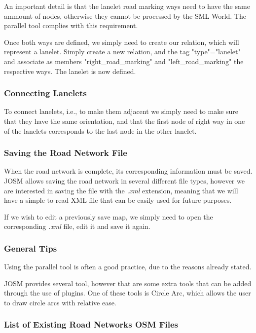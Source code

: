An important detail is that the lanelet road marking ways need to have the same ammount of nodes, otherwise they cannot be processed by the SML World. The parallel tool complies with this requirement.

Once both ways are defined, we simply need to create our relation, which will represent a lanelet. Simply create a new relation, and the tag "type"="lanelet" and associate as members "right\_road\_marking" and "left\_road\_marking" the respective ways. The lanelet is now defined. 

\subsubsection{Connecting Lanelets}

To connect lanelets, i.e., to make them adjacent we simply need to make sure that they have the same orientation, and that the first node of right way in one of the lanelets corresponds to the last node in the other lanelet.


\subsubsection{Saving the Road Network File}

When the road network is complete, its corresponding information must be saved. JOSM allows saving the road network in several different file types, however we are interested in saving the file with the \textit{.xml} extension, meaning that we will have a simple to read XML file that can be easily used for future purposes.

If we wish to edit a previously save map, we simply need to open the corresponding \textit{.xml} file, edit it and save it again.

\subsubsection{General Tips}

Using the parallel tool is often a good practice, due to the reasons already stated.

JOSM provides several tool, however that are some extra tools that can be added through the use of plugins. One of these tools is Circle Arc, which allows the user to draw circle arcs with relative ease.


\subsubsection{List of Existing Road Networks OSM Files}

